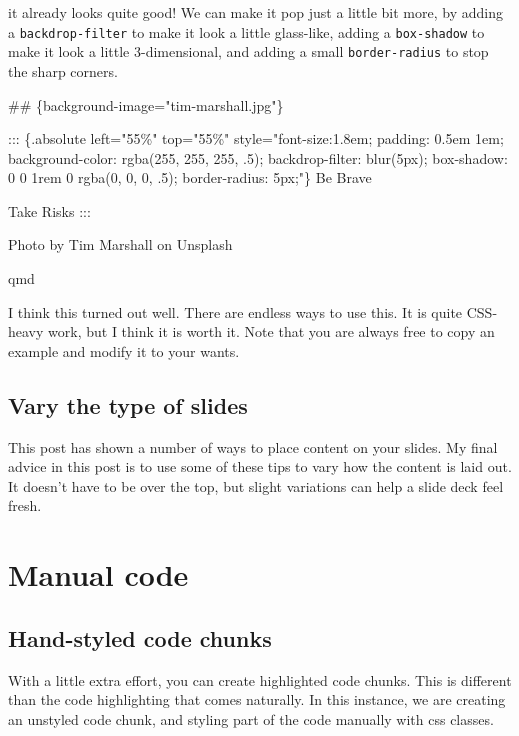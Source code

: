 \documentclass[
  letterpaper,
  DIV=11,
  numbers=noendperiod]{scrreprt}
\newenvironment{Shaded}{\begin{snugshade}}{\end{snugshade}}
\newcommand{\FunctionTok}[1]{\textcolor[rgb]{0.28,0.35,0.67}{#1}}
\newcommand{\NormalTok}[1]{\textcolor[rgb]{0.00,0.23,0.31}{#1}}
\begin{document}
it already looks quite good! We can make it pop just a little bit more,
by adding a \texttt{backdrop-filter} to make it look a little
glass-like, adding a \texttt{box-shadow} to make it look a little
3-dimensional, and adding a small \texttt{border-radius} to stop the
sharp corners.

\begin{Shaded}
\begin{Highlighting}[]
\FunctionTok{\#\# \{background{-}image="tim{-}marshall.jpg"\}}

\NormalTok{::: \{.absolute left="55\%" top="55\%" style="font{-}size:1.8em; padding: 0.5em 1em; background{-}color: rgba(255, 255, 255, .5); backdrop{-}filter: blur(5px); box{-}shadow: 0 0 1rem 0 rgba(0, 0, 0, .5); border{-}radius: 5px;"\}}
\NormalTok{Be Brave}

\NormalTok{Take Risks}
\NormalTok{:::}
\end{Highlighting}
\end{Shaded}

Photo by Tim Marshall on Unsplash

qmd

I think this turned out well. There are endless ways to use this. It is
quite CSS-heavy work, but I think it is worth it. Note that you are
always free to copy an example and modify it to your wants.

\section{Vary the type of slides}\label{vary-the-type-of-slides}

This post has shown a number of ways to place content on your slides. My
final advice in this post is to use some of these tips to vary how the
content is laid out. It doesn't have to be over the top, but slight
variations can help a slide deck feel fresh.

\chapter{Manual code}\label{manual-code}

\section{Hand-styled code chunks}\label{hand-styled-code-chunks}

With a little extra effort, you can create highlighted code chunks. This
is different than the code highlighting that comes naturally. In this
instance, we are creating an unstyled code chunk, and styling part of
the code manually with css classes.
\end{document}
